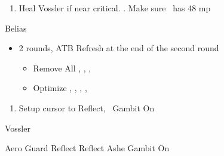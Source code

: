\begin{enumerate}
\item Heal Vossler if near critical. . Make sure \penelo\ has 48 mp
\end{enumerate}
\begin{battle}{Belias}
\begin{itemize}
\vaanf Reflect Vossler, then pick up chest
\vaanf Reflect \vaan
\item 2 rounds, ATB Refresh at the end of the second round
\begin{equip}
\begin{itemize}
\item Remove All \vaan, \penelo, \ashe, \basch
\item Optimize \basch, \balthier, \vaan, \ashe, \penelo
\end{itemize}
\end{equip}
\end{itemize}
\end{battle}
\begin{enumerate}
\item Setup cursor to Reflect, \penelo\ Gambit On
\end{enumerate}
\begin{battle}{Vossler}
\begin{itemize}
\ashef Aero Guard
\vaanf Reflect \vaan
\penelof Reflect Ashe
\ashef Gambit On
\end{itemize}
\end{battle}